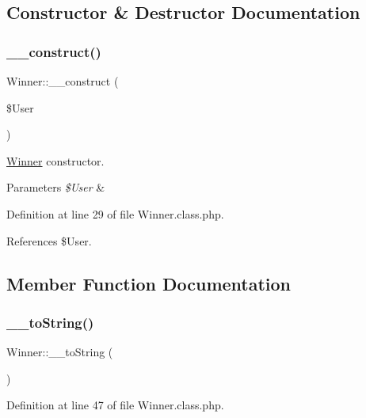 \subsection{Constructor \& Destructor Documentation}
\mbox{\label{class_winner_a319b7273e20555bde7adcf799529fc50}} 
\subsubsection{\texorpdfstring{\+\_\+\+\_\+construct()}{\_\_construct()}}
{\footnotesize\ttfamily Winner\+::\+\_\+\+\_\+construct (\begin{DoxyParamCaption}\item[{}]{\$\+User }\end{DoxyParamCaption})}

\hyperlink{class_winner}{Winner} constructor. 
\begin{DoxyParams}{Parameters}
{\em \$\+User} & \\
\hline
\end{DoxyParams}


Definition at line 29 of file Winner.\+class.\+php.



References \$\+User.



\subsection{Member Function Documentation}
\mbox{\label{class_winner_a16a7bef9b60aa3d2cf7e01a9404368a8}} 
\subsubsection{\texorpdfstring{\+\_\+\+\_\+to\+String()}{\_\_toString()}}
{\footnotesize\ttfamily Winner\+::\+\_\+\+\_\+to\+String (\begin{DoxyParamCaption}{ }\end{DoxyParamCaption})}



Definition at line 47 of file Winner.\+class.\+php.



